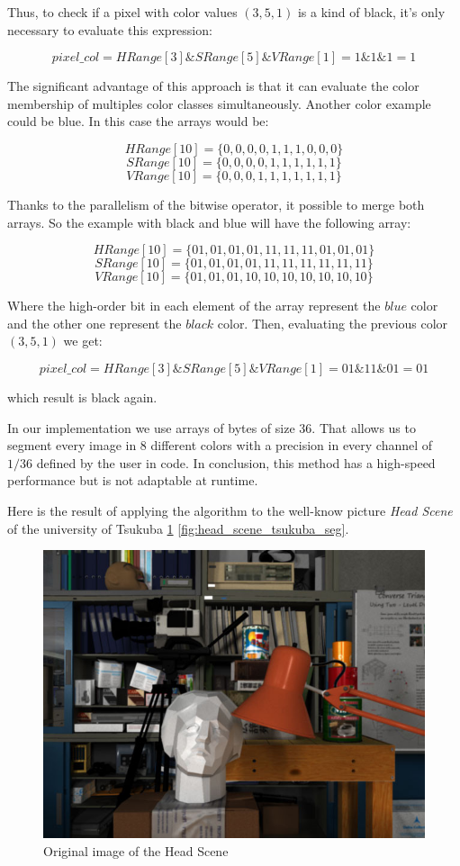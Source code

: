 Thus, to check if a pixel with color values $(3, 5, 1)$ is a kind of black, it's only necessary to evaluate this expression: 

\[ pixel\_col = HRange[3] \& SRange[5] \& VRange[1] = 1 \& 1 \& 1 = 1 \]

The significant advantage of this approach is that it can evaluate the color membership of multiples color classes simultaneously. Another color example could be blue. In this case the arrays would be:

{\centering
\[HRange[10] = \{0, 0, 0, 0, 1, 1, 1, 0, 0, 0\}\]
\[SRange[10] = \{0, 0, 0, 0, 1, 1, 1, 1, 1, 1\}\]
\[VRange[10] = \{0, 0, 0, 1, 1, 1, 1, 1, 1, 1\}\]
}

Thanks to the parallelism of the bitwise operator, it possible to merge both arrays. So the example with black and blue will have the following array:

{\centering
\[HRange[10] = \{01, 01, 01, 01, 11, 11, 11, 01, 01, 01\}\]
\[SRange[10] = \{01, 01, 01, 01, 11, 11, 11, 11, 11, 11\}\]
\[VRange[10] = \{01, 01, 01, 10, 10, 10, 10, 10, 10, 10\}\] 
} 

Where the high-order bit in each element  of the array represent the $blue$ color and the other one represent the $black$ color. Then, evaluating the previous color $(3,5,1)$ we get: 

\[pixel\_col = HRange[3] \& SRange[5] \& VRange[1] = 01 \& 11 \& 01 = 01\]

which result is black again.

In our implementation we use arrays of bytes of size 36. That allows us to segment every image in 8 different colors with a precision in every channel of $1/36$ defined by the user in code. In conclusion, this method has a high-speed performance but is not adaptable at runtime.

Here is the result of applying the algorithm to the well-know picture \textit{Head Scene} of the university of Tsukuba \ref{fig:head_scene_tsukuba_ori} \ref{fig:head_scene_tsukuba_seg}.


\begin{figure}[hbp]
	\centering
	\includegraphics[width=0.4\linewidth]{../Images/c2/head_scene_tsukuba_ori}
	\caption{Original image of the Head Scene}
	\label{fig:head_scene_tsukuba_ori}
\end{figure}

